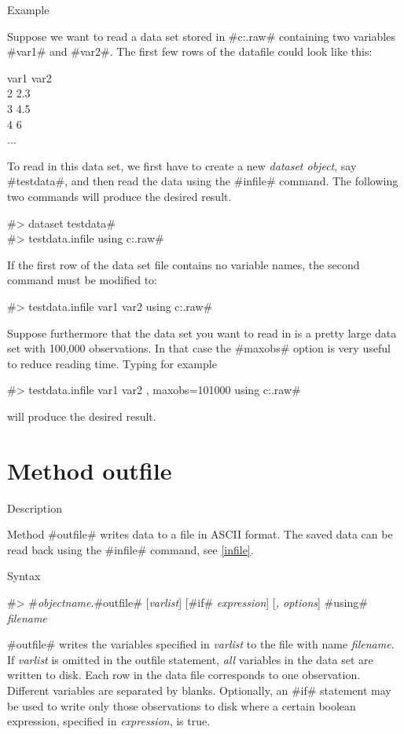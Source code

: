 \begin{stanza}{Example}

{Suppose we want to read a data set stored in
#c:\data\testdata.raw# containing two
variables #var1# and #var2#.
The first few rows of the datafile could look like this:

var1 var2 \\
2 2.3 \\
3 4.5 \\
4 6 \\
...


To read in this data set, we first have to create a new {\em dataset
object}, say #testdata#, and then read the data using
the #infile# command. The following two commands will produce the desired result.

#> dataset testdata# \\
#> testdata.infile using c:\data\testdata.raw#

If the first row of the data set file contains no variable names,
the second command must be modified to:

#> testdata.infile var1 var2 using c:\data\testdata.raw#

Suppose furthermore that the data set you want to read in is a
pretty large data set with 100,000
observations. In that case the #maxobs# option is very useful to reduce reading time.  Typing for example

#> testdata.infile var1 var2 , maxobs=101000 using c:\data\testdata.raw#

will produce the desired result.}
\end{stanza}

\clearpage



\section{Method outfile}
\label{outfile}   

\begin{stanza}{Description}

{Method #outfile# writes data to a file in ASCII format. The saved
data can be read back using the #infile# command, see
\autoref{infile}.}
\end{stanza}



\begin{stanza}{Syntax}

{#> #{\em objectname}.#outfile# [{\em varlist}] [#if# {\em expression}] [{\em , options}] #using# {\em filename}

#outfile# writes the variables specified in {\em varlist} to the
file with name {\em filename}. If {\em varlist} is omitted in the
outfile statement, {\em all} variables in the data set are written
to disk. Each row in the data file corresponds to one observation.
Different variables are separated by blanks. Optionally, an #if#
statement may be used to write only those observations to disk
where a certain boolean expression, specified in {\em expression},
is true.}
\end{stanza}


